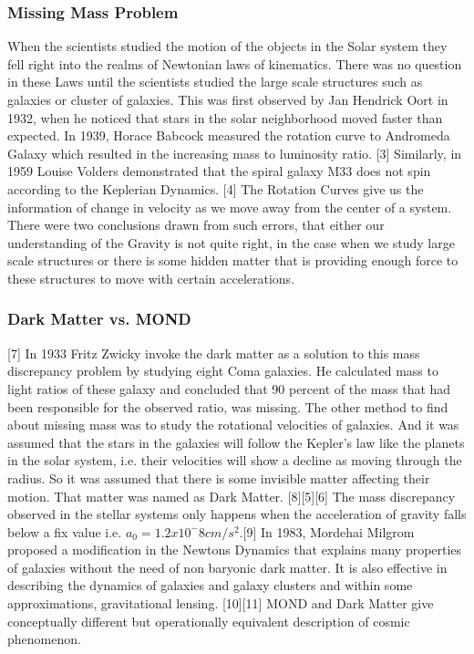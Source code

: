 \documentclass{article}
\begin{document}
\subsubsection{Missing Mass Problem}
When the scientists studied the motion of the objects in the Solar system they fell right into the realms of Newtonian laws of kinematics. There was no question in these Laws until the scientists studied the large scale structures such as galaxies or cluster of galaxies. This was first observed by Jan Hendrick Oort in 1932, when he noticed that stars in the solar neighborhood moved faster than expected. In 1939, Horace Babcock measured the rotation curve to Andromeda Galaxy which resulted in the increasing mass to luminosity ratio. [3] Similarly, in 1959 Louise Volders demonstrated that the spiral galaxy M33 does not spin according to the Keplerian Dynamics. [4] The Rotation Curves give us the information of change in velocity as we move away from the center of a system. There were two conclusions drawn from such errors, that either our understanding of the Gravity is not quite right, in the case when we study large scale structures or there is some hidden matter that is providing enough force to these structures to move with certain accelerations.

\subsubsection{Dark Matter vs. MOND}
[7]   In 1933 Fritz Zwicky invoke the dark matter as a solution to this mass discrepancy problem by studying eight Coma galaxies. He calculated mass to light ratios of these galaxy and concluded that 90 percent of the mass that had been responsible for the observed ratio, was missing. The other method to find about missing mass was to study the rotational velocities of galaxies. And it was assumed that the stars in the galaxies will follow the Kepler's law like the planets in the solar system, i.e. their velocities will show a decline as moving through the radius. So it was assumed that there is some invisible matter affecting their motion. That matter was named as Dark Matter.
[8][5][6] The mass discrepancy observed in the stellar systems only happens when the acceleration of gravity falls below a fix value i.e.
$a_{0}= 1.2x10^-8 cm/s^2$.[9] In 1983, Mordehai Milgrom proposed a modification in the Newtons Dynamics that explains many properties of galaxies without  the need of non baryonic dark matter. It is also effective in describing the dynamics of galaxies and galaxy clusters and within some approximations, gravitational lensing. [10][11] MOND and Dark Matter give conceptually different but operationally equivalent description of cosmic phenomenon.
\end{document}
